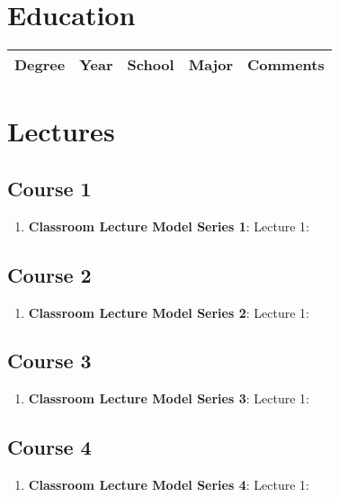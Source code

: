 \documentclass{ResumeDesignFormat1}
\begin{document}
\section{Education}

\begin{enumerate}
\end{enumerate}


\begin{table}[H]
\small
\centering
\begin{tabular}{p{1cm}p{1cm}p{1cm}p{1cm}}
 \hline
 Degree & Year & School & Major & Comments \\ 
 \hline

 \hline
\end{tabular}
\end{table}

\section{Lectures}
\subsection{Course 1}
\begin{enumerate}
\item \textbf{Classroom Lecture Model Series 1}: \textcolor{c2}{Lecture 1:}
\end{enumerate}
\subsection{Course 2}
\begin{enumerate}
\item \textbf{Classroom Lecture Model Series 2}: \textcolor{c2}{Lecture 1:}
\end{enumerate}
\subsection{Course 3}
\begin{enumerate}
\item \textbf{Classroom Lecture Model Series 3}: \textcolor{c2}{Lecture 1:}
\end{enumerate}
\subsection{Course 4}
\begin{enumerate}
\item \textbf{Classroom Lecture Model Series 4}: \textcolor{c2}{Lecture 1:}
\end{enumerate}
\end{document}
